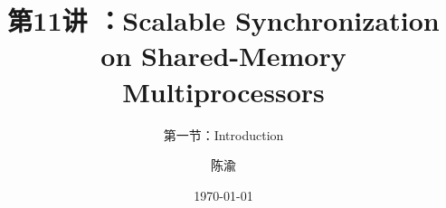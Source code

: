 


\title[第11讲]{第11讲 ：Scalable Synchronization on Shared-Memory Multiprocessors} %
\subtitle{第一节：Introduction }
\author{陈渝} %
\date{\today} %




\begin{frame}
\titlepage %
\end{frame}

